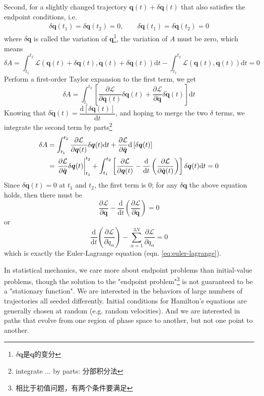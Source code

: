 \documentclass[
  10pt,
  twoside,
  openany,
  b5paper, %
  colorscheme = bootstrap-v4, %
]{qyxf-book}
\numberwithin{equation}{section}
\newcommand{\md}{\mathrm{d}}
\newcommand{\der}[2]{\dfrac{\md #1}{\md #2}}
\newcommand{\p}[2]{\dfrac{\partial #1}{\partial #2}}
\newcommand{\vq}{\boldsymbol{q}}
\newcommand{\dvq}{\dot{\vq}}
\newcommand{\dt}{\mathrm{d}t}
\newcommand{\suman}{\sum_{\alpha=1}^{3N}}
\newcommand{\lag}{\mathcal{L}} %
\newcommand{\inttot}{\int_{t_1}^{t_2}}
\begin{document}
Second, for a slightly changed trajectory $\vq(t)+\delta \vq(t)$ that also satisfies the endpoint conditions, i.e.
\begin{gather}
	\delta\vq(t_1)=\delta\vq(t_2)=0,\qquad \delta\dvq(t_1)=\delta\dvq(t_2)=0
\end{gather}
where $\delta\vq$ is called the variation of $\vq$\footnote{$\delta\vq$是$\vq$的变分},
the variation of $A$ must be zero, which means
\begin{equation*}
	\delta A=\inttot\lag\left(\vq(t)+\delta\vq(t),\dvq(t)+\delta\dvq(t)\right)\dt
	-\inttot\lag\left(\vq(t),\dvq(t)\right)\dt=0
\end{equation*}
Perform a first-order Taylor expansion to the first term, we get
\begin{equation*}
	\delta A=\inttot\left[\p{\lag}{\vq(t)}\delta\vq(t)+\p{\lag}{\dvq}\delta\dvq(t)\right]\dt
\end{equation*}
Knowing that $\delta\dvq(t)=\der{\left[\delta\vq(t)\right]}{t}$, and hoping to merge the two $\delta$ terms, we integrate the second term by parts\footnote{integrate ... by parts: 分部积分法}
\begin{align}
	\delta A&=\inttot\p{\lag}{\vq(t)}\delta\vq(t)\dt+\p{\lag}{\dvq}\md\left[\delta\vq(t)\right] \notag\\
	&=\left.\p{\lag}{\dvq}\delta\vq(t)\right|_{t_1}^{t_2}+\inttot\left[\p{\lag}{\vq(t)}-\der{}{t}\left(\p{\lag}{\dvq(t)}\right)\right]\delta\vq(t)\dt=0 \label{eq:deltaA}
\end{align}
Since $\delta\vq(t)=0$ at $t_1$ and $t_2$, the first term is 0; for any $\delta\vq$ the above equation holds, then there must be
\begin{equation}
	\p{\lag}{\vq}-\der{}{t}\left(\p{\lag}{\dvq}\right)=0
\end{equation}
or 
\begin{equation}
	\der{}{t}\left(\p{\lag}{\dot{q}_\alpha}\right)-\suman\p{\lag}{q_\alpha}=0
\end{equation}
which is exactly the Euler-Lagrange equation (eqn. \ref{eq:euler-lagrange}).

In statistical mechanics, we care more about endpoint problems than initial-value problems, though the solution to the "endpoint problem"\footnote{相比于初值问题，有两个条件要满足} is not guaranteed to be a "stationary function". We are interested in the behaviors of large numbers of trajectories all seeded differently. Initial conditions for Hamilton's equations are generally chosen at random (e.g. random velocities). And we are interested in paths that evolve from one region of phase space to another, but not one point to another.
\end{document}
